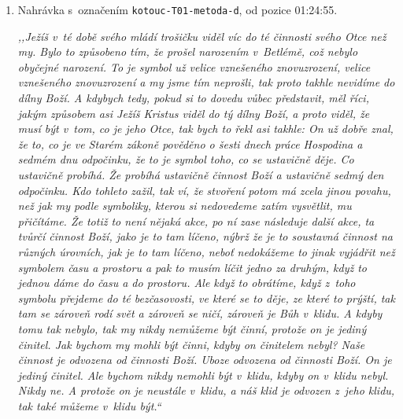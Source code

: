\begin{enumerate}
{}


\item{
Nahrávka s~označením \texttt{kotouc-T01-metoda-d}, od pozice 01:24:55.

\textit{%
,,Ježíš v~té době svého mládí trošičku viděl víc do té činnosti svého Otce než
my. Bylo to způsobeno tím, že prošel narozením v~Betlémě, což nebylo obyčejné
narození. To je symbol už velice vznešeného znovuzrození, velice vznešeného
znovuzrození a my jsme tím neprošli, tak proto takhle nevidíme do dílny Boží. A
kdybych tedy, pokud si to dovedu vůbec představit, měl říci, jakým způsobem asi
Ježíš Kristus viděl do tý dílny Boží, a proto viděl, že musí být v~tom, co je jeho
Otce, tak bych to řekl asi takhle: On už dobře znal, že to, co je ve Starém zákoně
pověděno o šesti dnech práce Hospodina a sedmém dnu odpočinku, že to je symbol
toho, co se ustavičně děje. Co ustavičně probíhá. Že probíhá ustavičně činnost Boží
a ustavičně sedmý den odpočinku. Kdo tohleto zažil, tak ví, že stvoření potom má
zcela jinou povahu, než jak my podle symboliky, kterou si nedovedeme zatím
vysvětlit, mu
přičítáme. Že totiž to není nějaká akce, po ní zase následuje další akce, ta tvůrčí
činnost Boží, jako je to tam líčeno, nýbrž že je to soustavná činnost na různých
úrovních, jak je to tam líčeno, neboť nedokážeme to jinak vyjádřit než symbolem
času a prostoru a pak to musím líčit jedno za druhým, když to jednou dáme do času
a do prostoru. Ale když to obrátíme, když z~toho symbolu přejdeme do té
bezčasovosti,
ve které se to děje, ze které to prýští, tak tam se zároveň rodí svět a zároveň se
ničí, zároveň je Bůh v~klidu. A kdyby tomu tak nebylo, tak my nikdy nemůžeme být
činní, protože on je jediný činitel. Jak bychom my mohli být činni, kdyby on
činitelem nebyl? Naše činnost je odvozena od činnosti Boží. Uboze odvozena od
činnosti Boží.
On je jediný činitel. Ale bychom nikdy nemohli být v~klidu, kdyby on v~klidu
nebyl.
Nikdy ne. A protože on je neustále v~klidu, a náš klid je odvozen z~jeho klidu,
tak také můžeme v~klidu být.``
}

}
\end{enumerate}
